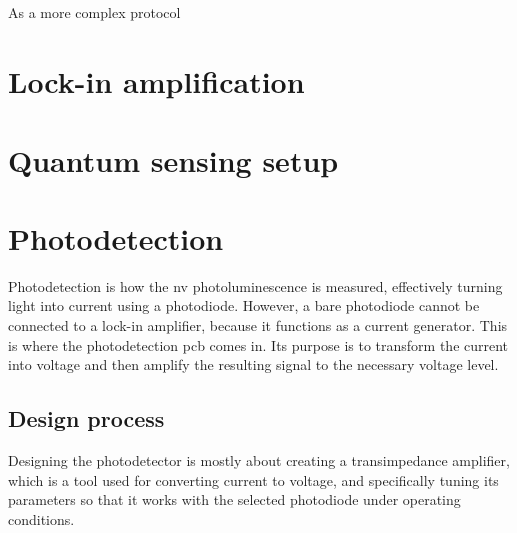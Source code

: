 \subsection{}
As a more complex protocol

\section{Lock-in amplification} \label{chap:lockin}
\section{Quantum sensing setup}
\section{Photodetection }
Photodetection is how the \gls{nv} photoluminescence is measured, effectively turning light into current using a photodiode. However, a bare photodiode cannot be connected to a lock-in amplifier, because it functions as a current generator. This is where the photodetection \gls {pcb} comes in. Its purpose is to transform the current into voltage and then amplify the resulting signal to the necessary voltage level. 

\subsection{Design process}
Designing the photodetector is mostly about creating a transimpedance amplifier, which is a tool used for converting current to voltage, and specifically tuning its parameters so that it works with the selected photodiode under operating conditions. 

